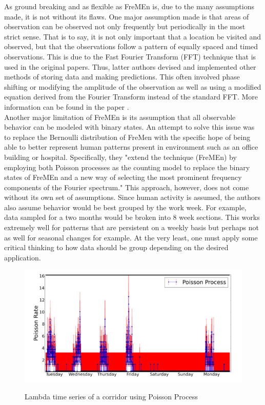   As ground breaking and as flexible as FreMEn is, due to the many assumptions
  made, it is not without its flaws. One major assumption made is that areas of
  observation can be observed not only frequently but periodically in the most
  strict sense. That is to say, it is not only important that a location be
  visited and observed, but that the observations follow a pattern of equally
  spaced and timed observations. This is due to the Fast Fourier Transform (FFT)
  technique that is used in the original papers. Thus, latter authors devised and
  implemented other methods of storing data and making predictions. This often
  involved phase shifting or modifying the amplitude of the observation as well
  as using a modified equation derived from the Fourier Transform instead of the
  standard FFT. More information can be found in the paper \cite{Santos2016}. \\

  Another major limitation of FreMEn is its assumption that all observable
  behavior can be modeled with binary states. An  attempt to solve this issue
  was to replace the Bernoulli distribution of FreMen with the specific hope of
  being able to better represent human patterns present in environment such as
  an office building or hospital. Specifically, they "extend the technique
  (FreMEn) by employing both Poisson processes as the counting model to replace
  the binary states of FreMEn and a new way of selecting the most prominent
  frequency components of the Fourier spectrum."\cite{Jovan2016} This approach,
  however, does not come without its own set of assumptions. Since human
  activity is assumed, the authors also assume behavior would be best grouped by
  the work week. For example, data sampled for a two months would be broken into
  8 week sections. This works extremely well for patterns that are persistent on
  a weekly basis but perhaps not as well for seasonal changes for example. At
  the very least, one must apply some critical thinking to how data should be
  group depending on the desired application.


  \begin{figure}[!htb]
    \centering
    \includegraphics[width=\linewidth]{images/poisson-spectral-process.png}
    \caption{Lambda time series of a corridor using Poisson Process}
    \cite{Jovan2016}
    \label{figure:PSP}
  \end{figure}


